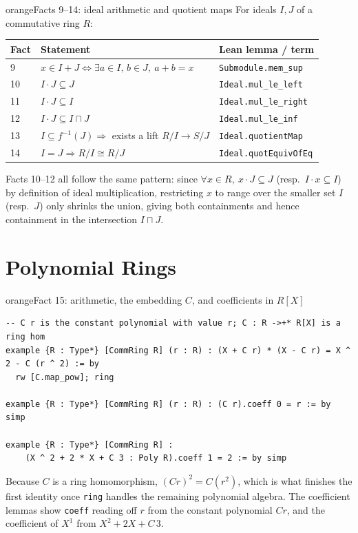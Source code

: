 \documentclass[11pt]{article}
\begin{document}
\begin{defbox}{orange}{Facts 9--14: ideal arithmetic and quotient maps}
For ideals $I,J$ of a commutative ring $R$:
\end{defbox}
\renewcommand{\arraystretch}{1.3}
\begin{center}
\begin{tabular}{@{}p{1.3cm}p{7cm}p{5.5cm}@{}}
\toprule
\textbf{Fact} & \textbf{Statement} & \textbf{Lean lemma / term} \\
\midrule
9 & $x\in I+J \iff \exists a\in I,\, b\in J,\ a+b=x$ & \verb|Submodule.mem_sup| \\
10 & $I\cdot J \subseteq J$ & \verb|Ideal.mul_le_left| \\
11 & $I\cdot J \subseteq I$ & \verb|Ideal.mul_le_right| \\
12 & $I\cdot J \subseteq I\sqcap J$ & \verb|Ideal.mul_le_inf| \\
13 & $I\subseteq f^{-1}(J) \Rightarrow$ exists a lift $R/I\to S/J$ & \verb|Ideal.quotientMap| \\
14 & $I=J \Rightarrow R/I \cong R/J$ & \verb|Ideal.quotEquivOfEq| \\
\bottomrule
\end{tabular}
\end{center}

\begin{takeaway}
Facts 10--12 all follow the same pattern: since $\forall x\in R,\ x\cdot J\subseteq J$ (resp.\ $I\cdot x\subseteq I$) by definition of ideal multiplication, restricting $x$ to range over the smaller set $I$ (resp.\ $J$) only shrinks the union, giving both containments and hence containment in the intersection $I\sqcap J$.
\end{takeaway}

\section{Polynomial Rings}

\begin{defbox}{orange}{Fact 15: arithmetic, the embedding \texorpdfstring{$C$}{C}, and coefficients in \texorpdfstring{$R[X]$}{R[X]}}
\begin{lstlisting}
-- C r is the constant polynomial with value r; C : R ->+* R[X] is a ring hom
example {R : Type*} [CommRing R] (r : R) : (X + C r) * (X - C r) = X ^ 2 - C (r ^ 2) := by
  rw [C.map_pow]; ring

example {R : Type*} [CommRing R] (r : R) : (C r).coeff 0 = r := by simp

example {R : Type*} [CommRing R] :
    (X ^ 2 + 2 * X + C 3 : Poly R).coeff 1 = 2 := by simp
\end{lstlisting}
Because $C$ is a ring homomorphism, $(C r)^2 = C(r^2)$, which is what finishes the first identity once \verb|ring| handles the remaining polynomial algebra. The coefficient lemmas show \verb|coeff| reading off $r$ from the constant polynomial $C r$, and the coefficient of $X^1$ from $X^2+2X+C\,3$.
\end{defbox}
\end{document}
